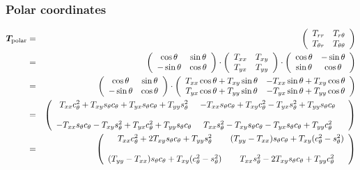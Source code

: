 \documentclass[a4paper,12pt]{article}
\newcommand{\nn}{\nonumber}
\begin{document}
\subsubsection{Polar coordinates}

\begin{eqnarray}
{\bm T}_{\rm polar}
&=&
\left(\begin{array}{cc}
T_{rr}       & T_{r\theta}     \\ 
T_{\theta r} & T_{\theta\theta}
\end{array}\right) \nn\\ 
&=&
\left(\begin{array}{cc}
 \cos \theta&\sin \theta \\
-\sin \theta&\cos \theta \\
\end{array}\right)
\cdot
\left(\begin{array}{cc}
T_{xx} & T_{xy}  \\
T_{yx} & T_{yy} 
\end{array}\right)
\cdot
\left(\begin{array}{cc}
\cos \theta & -\sin \theta \\
\sin \theta &  \cos \theta \\
\end{array}\right) 
\nn\\
&=&
\left(\begin{array}{cc}
 \cos \theta&\sin \theta \\
-\sin \theta&\cos \theta \\
\end{array}\right)
\cdot
\left(
\begin{array}{cc}
T_{xx} \cos\theta  + T_{xy} \sin\theta & -T_{xx} \sin\theta + T_{xy} \cos\theta \\ 
T_{yx} \cos\theta  + T_{yy} \sin\theta & -T_{yx} \sin\theta + T_{yy} \cos\theta 
\end{array}
\right) \nn\\
&=& 
\left(\begin{array}{ccc}
T_{xx} c^2_\theta  + T_{xy} s_\theta c_\theta 
+T_{yx} s_\theta c_\theta  + T_{yy} s^2_\theta & 
-T_{xx} s_\theta c_\theta + T_{xy} c^2_\theta
-T_{yx} s^2_\theta + T_{yy} s_\theta c_\theta &
 \\ \\
-T_{xx} s_\theta c_\theta  - T_{xy} s^2_\theta 
+ T_{yx} c^2_\theta  + T_{yy} s_\theta c_\theta &  
T_{xx} s^2_\theta - T_{xy} s_\theta c_\theta 
-T_{yx} s_\theta c_\theta + T_{yy} c^2_\theta
\end{array}
\right) \nn\\
&=& 
\left(\begin{array}{cc}
T_{xx} c^2_\theta  + 2T_{xy} s_\theta c_\theta + T_{yy} s^2_\theta & 
(T_{yy}-T_{xx}) s_\theta c_\theta + T_{xy} (c^2_\theta - s^2_\theta)   \\ 
\\
(T_{yy}-T_{xx}) s_\theta c_\theta  + T_{xy} (c^2_\theta -s^2_\theta )  &  
T_{xx} s^2_\theta - 2T_{xy} s_\theta c_\theta + T_{yy} c^2_\theta  
\end{array}
\right) \nn
\end{eqnarray}
\end{document}
